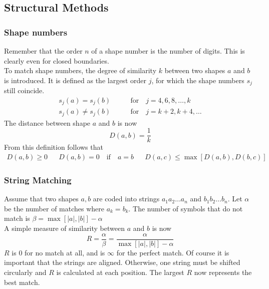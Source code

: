 \subsection{Structural Methods} %

\subsubsection{Shape numbers}
Remember that the order $n$ of a shape number is the number of digits. This is clearly even for closed boundaries. \\

To match shape numbers, the degree of similarity $k$ between two shapes $a$ and $b$ is introduced.
It is defined as the largest order $j$, for which the shape numbers $s_j$ still coincide.
\begin{align*}
	s_j(a) = s_j(b) \qquad & \text{for} \quad j=4,6,8,\ldots,k \\
	s_j(a) \neq s_j(b) \qquad & \text{for} \quad j=k+2,k+4,\ldots
\end{align*}
The distance between shape $a$ and $b$ is now
	\[
		D(a,b) = \frac{1}{k}
	\]
From this definition follows that
\begin{align*}
	D(a,b) \geq 0 && D(a,b) = 0 \quad \text{if} \quad a=b && D(a,c) \leq \max[D(a,b),D(b,c)]
\end{align*}

\subsubsection{String Matching}
Assume that two shapes $a,b$ are coded into strings $a_1a_2\ldots a_n$ and $b_1b_2\ldots b_n$.
Let $\alpha$ be the number of matches where $a_k = b_k$.
The number of symbols that do not match is $\beta = \max[|a|,|b|] - \alpha$ \\

A simple measure of similarity between $a$ and $b$ is now
	\[
		R = \frac{\alpha}{\beta} = \frac{\alpha}{\max[|a|,|b|] - \alpha}
	\]
$R$ is $0$ for no match at all, and is $\infty$ for the perfect match.
Of course it is important that the strings are aligned.
Otherwise, one string must be shifted circularly and $R$ is calculated at each position.
The largest $R$ now represents the best match.
